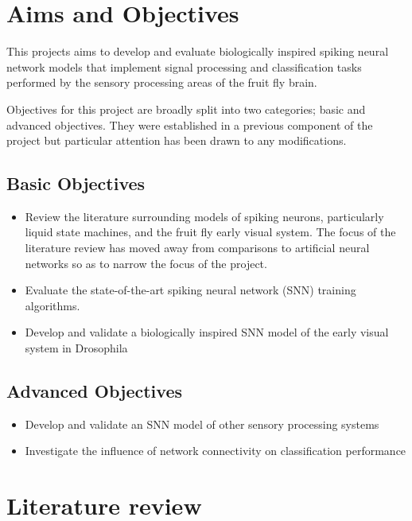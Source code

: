 \documentclass[fleqn,12pt]{wlscirep}
\begin{document}
\section*{Aims and Objectives}
This projects aims to develop and evaluate biologically inspired spiking neural network models that implement signal processing and classification tasks performed by the sensory processing areas of the fruit fly brain.

Objectives for this project are broadly split into two categories; basic and advanced objectives. They were  established in a previous component of the project but particular attention has been drawn to any modifications.

\subsection*{Basic Objectives}
\begin{itemize}
  \item Review the literature surrounding models of spiking neurons, particularly liquid state machines, and the fruit fly early visual system. The focus of the literature review has moved away from comparisons to artificial neural networks so as to narrow the focus of the project.
  \item Evaluate the state-of-the-art  spiking neural network (SNN) training algorithms.
  \item Develop and validate a biologically inspired SNN model of the early visual system in Drosophila
\end{itemize}

\subsection*{Advanced Objectives}
\begin{itemize}
    \item Develop and validate an SNN model of other sensory processing systems
    \item Investigate the influence of network connectivity on classification performance
\end{itemize}

\section*{Literature review}
\end{document}
